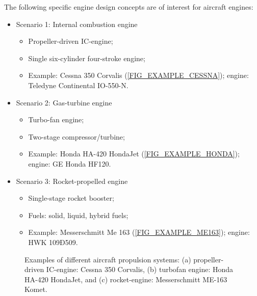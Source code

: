 The following specific engine design concepts are of interest for aircraft engines:
\begin{itemize}
\item {Scenario 1: Internal combustion engine}
  \begin{itemize}[noitemsep,topsep=0pt]
    \item Propeller-driven IC-engine;
    \item Single six-cylinder four-stroke engine;
    \item Example: Cessna 350 Corvalis (\cref{FIG_EXAMPLE_CESSNA}); engine:  Teledyne Continental IO-550-N.
  \end{itemize}
\item {Scenario 2: Gas-turbine engine}
  \begin{itemize}[noitemsep,topsep=0pt]
    \item Turbo-fan engine;
    \item Two-stage compressor/turbine;
    \item Example: Honda HA-420 HondaJet (\cref{FIG_EXAMPLE_HONDA}); engine: GE Honda HF120.
  \end{itemize}
\item {Scenario 3: Rocket-propelled engine}
  \begin{itemize}[noitemsep,topsep=0pt]
    \item Single-stage rocket booster;
    \item Fuels: solid, liquid, hybrid fuels;
    \item Example: Messerschmitt Me 163 (\cref{FIG_EXAMPLE_ME163}); engine: HWK 109Ð509.
  \end{itemize}
\end{itemize}

\begin{figure}[!tbh!]
  \begin{center}
  \begin{subfigmatrix}{1}
  \end{subfigmatrix}
  \caption{\label{FIG_EXAMPLE}Examples of different aircraft propulsion systems: (a) propeller-driven IC-engine: Cessna 350 Corvalis, (b) turbofan engine: Honda HA-420 HondaJet, and (c) rocket-engine: Messerschmitt ME-163 Komet.}
  \end{center}
\end{figure}
\vspace*{1in}


